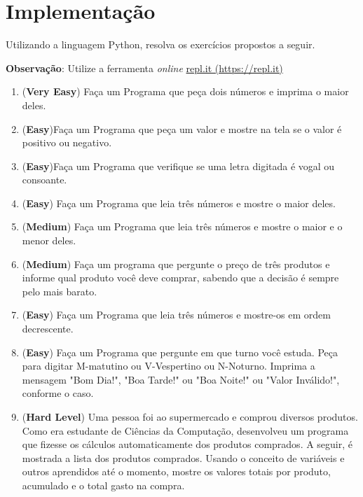\documentclass[12pt,a4paper]{article}
\begin{document}
	\section{Implementação}
		Utilizando a linguagem Python, resolva os exercícios propostos a seguir.

		\textbf{Observação}: Utilize a ferramenta \textit{online} \href{https://repl.it/}{repl.it (https://repl.it)}
	
		\begin{enumerate}
			\item (\textbf{Very Easy}) Faça um Programa que peça dois números e imprima o maior deles.
			\item (\textbf{Easy})Faça um Programa que peça um valor e mostre na tela se o valor é positivo ou negativo.
			\item (\textbf{Easy})Faça um Programa que verifique se uma letra digitada é vogal ou consoante.
			\item (\textbf{Easy}) Faça um Programa que leia três números e mostre o maior deles.
			\item (\textbf{Medium}) Faça um Programa que leia três números e mostre o maior e o menor deles.
			\item (\textbf{Medium}) Faça um programa que pergunte o preço de três produtos e informe qual produto você deve comprar, sabendo que a decisão é sempre pelo mais barato.
			\item (\textbf{Easy}) Faça um Programa que leia três números e mostre-os em ordem decrescente.
			\item (\textbf{Easy}) Faça um Programa que pergunte em que turno você estuda. Peça para digitar M-matutino ou V-Vespertino ou N-Noturno. Imprima a mensagem "Bom Dia!", "Boa Tarde!" ou "Boa Noite!" ou "Valor Inválido!", conforme o caso.
			\item (\textbf{Hard Level}) Uma pessoa foi ao supermercado e comprou diversos produtos. Como era estudante de Ciências da Computação, desenvolveu um programa que fizesse os cálculos automaticamente dos produtos comprados. A seguir, é mostrada a lista dos produtos comprados. Usando o conceito de variáveis e outros aprendidos até o momento, mostre os valores totais por produto, acumulado e o total gasto na compra.


\end{enumerate}
\end{document}
